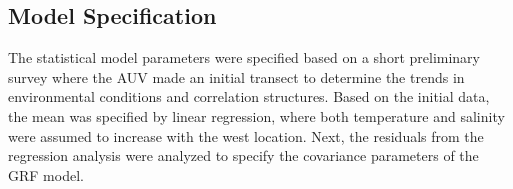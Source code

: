 \documentclass[aoas]{imsart}
\begin{document}
\subsection{Model Specification}
\label{sec:exp_modeling}

The statistical model parameters were specified based on a short
preliminary survey where the AUV made an initial transect to determine
the trends in environmental conditions and correlation
structures. Based on the initial data, the mean was specified by linear regression, where both temperature and salinity
were assumed to increase with the west location. Next, the residuals from the regression analysis were analyzed to specify the covariance parameters of the GRF model.

\end{document}
